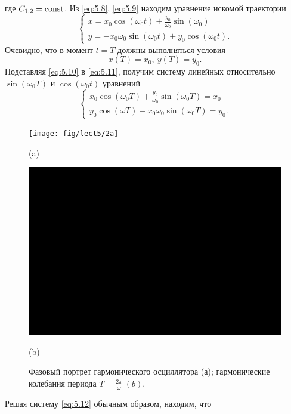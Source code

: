 где $C_{1,2}= \textrm{const}$. Из \eqref{eq:5.8}, \eqref{eq:5.9} находим уравнение искомой траектории
\begin{equation}
        \label{eq:5.10}
        \begin{cases}
                x=x_0 \cos(\omega_0t) + \frac{y_0}{\omega_0} \sin(\omega_0)\\
                y = -x_0\omega_0\sin(\omega_0t) + y_0\cos(\omega_0t). 
        \end{cases}
\end{equation}
Очевидно, что в момент $t=T$  должны выполняться условия
\begin{equation}
        \label{eq:5.11}
        x(T) = x_0, ~ y(T)=y_0.
\end{equation}
Подставляя \eqref{eq:5.10} в \eqref{eq:5.11}, получим систему линейных относительно $\sin(\omega_0 T)$ и $\cos(\omega_0t)$ уравнений
 \begin{equation}
        \label{eq:5.12}
        \begin{cases}
                x_0 \cos(\omega_0 T) + \frac{y_0}{\omega_0} \sin(\omega_0 T) = x_0\\
                y_0 \cos(\omega T) - x_0\omega_0 \sin(\omega_0 T) = y_0.
        \end{cases}
\end{equation}

\begin{figure}[h!]
        \centering
        \begin{minipage}{0.45\linewidth}
                \centering  
                \texttt{[image: fig/lect5/2a]}

                (a)
        \end{minipage}
        \begin{minipage}{0.45\linewidth}
                \centering  
                \includegraphics[]{fig/lect5/2b}

                (b)      
        \end{minipage}
        \caption{Фазовый портрет гармонического осциллятора (а); гармонические колебания периода
        $T =  \frac{2\pi}{\omega}~ (b)$.}
        \label{fig:5.2}
\end{figure}
Решая систему \eqref{eq:5.12} обычным образом, находим, что

